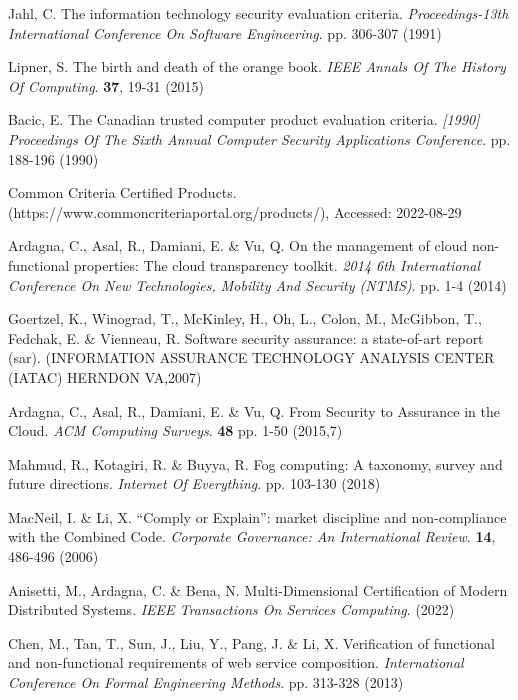Jahl, C. The information technology security evaluation criteria. {\em Proceedings-13th International Conference On Software Engineering}. pp. 306-307 (1991)

Lipner, S. The birth and death of the orange book. {\em IEEE Annals Of The History Of Computing}. \textbf{37}, 19-31 (2015)

Bacic, E. The Canadian trusted computer product evaluation criteria. {\em [1990] Proceedings Of The Sixth Annual Computer Security Applications Conference}. pp. 188-196 (1990)

Common Criteria Certified Products. (https://www.commoncriteriaportal.org/products/), Accessed: 2022-08-29

Ardagna, C., Asal, R., Damiani, E. \& Vu, Q. On the management of cloud non-functional properties: The cloud transparency toolkit. {\em 2014 6th International Conference On New Technologies, Mobility And Security (NTMS)}. pp. 1-4 (2014)

Goertzel, K., Winograd, T., McKinley, H., Oh, L., Colon, M., McGibbon, T., Fedchak, E. \& Vienneau, R. Software security assurance: a state-of-art report (sar). (INFORMATION ASSURANCE TECHNOLOGY ANALYSIS CENTER (IATAC) HERNDON VA,2007)

Ardagna, C., Asal, R., Damiani, E. \& Vu, Q. From Security to Assurance in the Cloud. {\em ACM Computing Surveys}. \textbf{48} pp. 1-50 (2015,7)

Mahmud, R., Kotagiri, R. \& Buyya, R. Fog computing: A taxonomy, survey and future directions. {\em Internet Of Everything}. pp. 103-130 (2018)

MacNeil, I. \& Li, X. “Comply or Explain”: market discipline and non-compliance with the Combined Code. {\em Corporate Governance: An International Review}. \textbf{14}, 486-496 (2006)

Anisetti, M., Ardagna, C. \& Bena, N. Multi-Dimensional Certification of Modern Distributed Systems. {\em IEEE Transactions On Services Computing}. (2022)

Chen, M., Tan, T., Sun, J., Liu, Y., Pang, J. \& Li, X. Verification of functional and non-functional requirements of web service composition. {\em International Conference On Formal Engineering Methods}. pp. 313-328 (2013)

